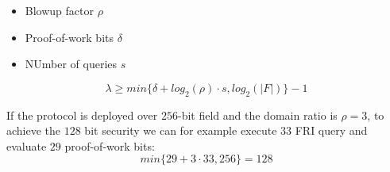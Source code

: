 \documentclass{zkdl-presentation-template}
\begin{document}
\begin{frame}
    \begin{itemize}
        \item Blowup factor $\rho$
        \item Proof-of-work bits $\delta$
        \item NUmber of queries $s$
    \end{itemize}

    \begin{equation*}
        \lambda \geq min\{ \delta + log_2(\rho) \cdot s, log_2(|F|) \} - 1
    \end{equation*}

    \begin{example}
        If the protocol is deployed over $256$-bit field and the domain ratio is $\rho = 3$, to achieve the $128$ bit security we can for example execute $33$ FRI query and evaluate $29$ proof-of-work bits:
        \begin{equation*}
            min\{29+3\cdot 33, 256\} = 128
        \end{equation*}
    \end{example}
\end{frame}
\end{document}
